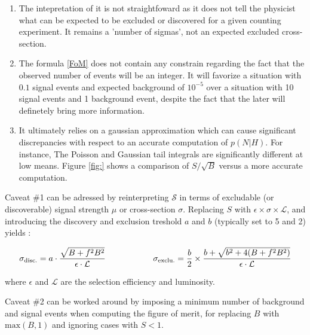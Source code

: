     \begin{enumerate}
        \item The intepretation of it is not straightfoward as it does not tell the 
              physicist what can be expected to be excluded or discovered 
              for a given counting experiment. It remains a 'number of sigmas', not an 
              expected excluded cross-section.
        \item The formula \ref{FoM} does not contain any constrain regarding the fact that
              the observed number of events will be an integer. It will favorize a situation
              with $0.1$ signal events and expected background of $10^{-5}$ over a 
              situation with 10 signal events and 1 background event, despite the fact that
              the later will definetely bring more information.
        \item It ultimately relies on a gaussian approximation which can cause significant
              discrepancies with respect to an accurate computation of $p(N|H)$. For instance,
              The Poisson and Gaussian tail integrals are significantly different at low
              means. Figure \ref{fig:} shows a comparison of $S/\sqrt{B}$ versus a
              more accurate computation.
    \end{enumerate}

    Caveat \#1 can be adressed by reinterpreting $\mathcal{S}$ in terms of excludable 
    (or discoverable) signal strength $\mu$ or cross-section $\sigma$. Replacing 
    $S$ with $\epsilon \times \sigma \times \mathcal{L}$, and introducing the discovery 
    and exclusion treshold $a$ and $b$ (typically set to 5 and 2) yields :

    \begin{equation}
        \mathcal{\sigma}_\text{disc.} = a \cdot \frac{\sqrt{B+f^2B^2}}{\epsilon \cdot \mathcal{L}}
       \hspace*{2cm} 
       \mathcal{\sigma}_\text{exclu.} = \frac{b}{2} \times \frac{b + \sqrt{b^2 + 4 (B + f^2B^2)}}{\epsilon \cdot \mathcal{L}}
       \label{FoM2}
    \end{equation}

    where $\epsilon$ and $\mathcal{L}$ are the selection efficiency and luminosity.

    Caveat \#2 can be worked around by imposing a minimum number of background and signal
    events when computing the figure of merit, for replacing $B$ with $\text{max}(B,1)$
    and ignoring cases with $S < 1$.

